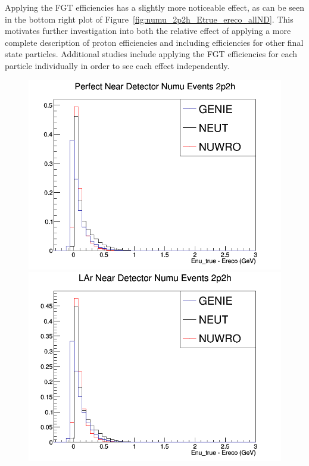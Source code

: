 \documentclass[12pt]{article}
\begin{document}
Applying the FGT efficiencies has a slightly more noticeable effect, as can be seen in the bottom right plot of Figure~\ref{fig:numu_2p2h_Etrue_ereco_allND}. This motivates further investigation into both the relative effect of applying a more complete description of proton efficiencies and including efficiencies for other final state particles. Additional studies include applying the FGT efficiencies for each particle individually in order to see each effect independently. 
\begin{figure}[h]
\centering
{}
\includegraphics[width=\linewidth]{Ereco_Etrue/numu_perfect_ND_2p2h.png}
\endminipage
{}
\includegraphics[width=\linewidth]{Ereco_Etrue/numu_LAr_2p2h.png}

\end{figure}
\end{document}
